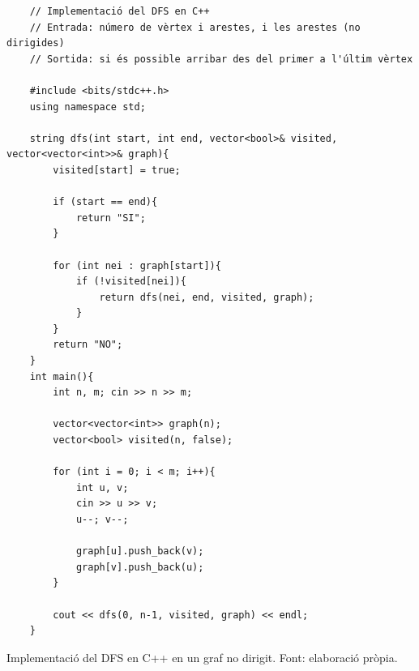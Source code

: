 \begin{longlisting}
    \begin{verbatim}
    // Implementació del DFS en C++
    // Entrada: número de vèrtex i arestes, i les arestes (no dirigides)
    // Sortida: si és possible arribar des del primer a l'últim vèrtex
    
    #include <bits/stdc++.h>
    using namespace std;
    
    string dfs(int start, int end, vector<bool>& visited, vector<vector<int>>& graph){
        visited[start] = true;
    
        if (start == end){
            return "SI";
        }
    
        for (int nei : graph[start]){
            if (!visited[nei]){
                return dfs(nei, end, visited, graph);
            }
        }
        return "NO";
    }
    int main(){
        int n, m; cin >> n >> m;
    
        vector<vector<int>> graph(n);
        vector<bool> visited(n, false);
    
        for (int i = 0; i < m; i++){
            int u, v;
            cin >> u >> v;
            u--; v--;
    
            graph[u].push_back(v);
            graph[v].push_back(u);
        }
    
        cout << dfs(0, n-1, visited, graph) << endl;
    }

    \end{verbatim}
    \caption[Implementació del DFS en C++ en un graf no dirigit.]{Implementació del DFS en C++ en un graf no dirigit. Font: elaboració pròpia.}
    \label{Figura}
\end{longlisting}%

